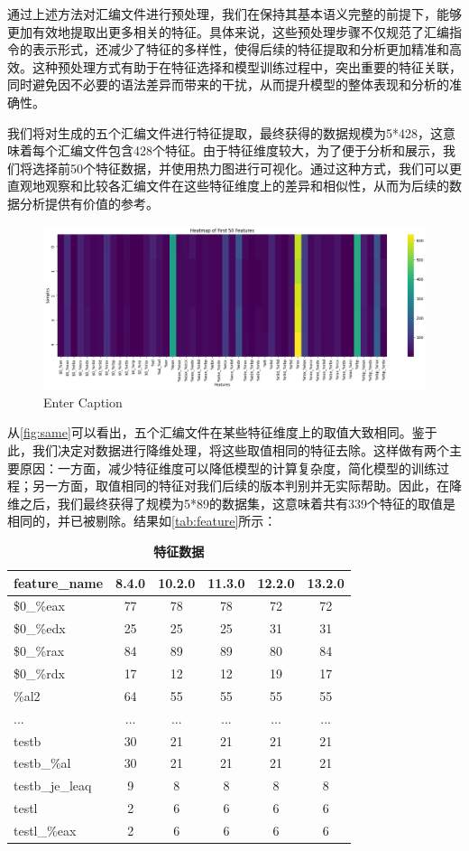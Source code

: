  通过上述方法对汇编文件进行预处理，我们在保持其基本语义完整的前提下，能够更加有效地提取出更多相关的特征。具体来说，这些预处理步骤不仅规范了汇编指令的表示形式，还减少了特征的多样性，使得后续的特征提取和分析更加精准和高效。这种预处理方式有助于在特征选择和模型训练过程中，突出重要的特征关联，同时避免因不必要的语法差异而带来的干扰，从而提升模型的整体表现和分析的准确性。

  我们将对生成的五个汇编文件进行特征提取，最终获得的数据规模为5*428，这意味着每个汇编文件包含428个特征。由于特征维度较大，为了便于分析和展示，我们将选择前50个特征数据，并使用热力图进行可视化。通过这种方式，我们可以更直观地观察和比较各汇编文件在这些特征维度上的差异和相似性，从而为后续的数据分析提供有价值的参考。
  \begin{figure}
      \centering
      \includegraphics[width=1\linewidth]{figures/same.png}
      \caption{Enter Caption}
      \label{fig:same}
  \end{figure}


从\autoref{fig:same}可以看出，五个汇编文件在某些特征维度上的取值大致相同。鉴于此，我们决定对数据进行降维处理，将这些取值相同的特征去除。这样做有两个主要原因：一方面，减少特征维度可以降低模型的计算复杂度，简化模型的训练过程；另一方面，取值相同的特征对我们后续的版本判别并无实际帮助。因此，在降维之后，我们最终获得了规模为5*89的数据集，这意味着共有339个特征的取值是相同的，并已被剔除。结果如\autoref{tab:feature}所示：
\begin{table}[H]
\caption{\textbf{特征数据}}%
\label{tab:feature}
\centering%
\begin{tabular}{lccccc}%
\toprule%
 feature\_name&8.4.0 & 10.2.0 & 11.3.0 & 12.2.0 & 13.2.0 \\ 
\midrule%
\$0\_\%eax&77&78&78&72&72 \\
\$0\_\%edx&25 & 25 & 25 & 31 & 31 \\
\$0\_\%rax&84 & 89 & 89 & 80 & 84 \\
\$0\_\%rdx&17 & 12 & 12 & 19 & 17 \\
\%al2 & 64 & 55 & 55 & 55&55 \\
...&... & ... & ... & ... & ... \\
testb&30 & 21 & 21 & 21 & 21 \\
testb\_\%al&30 & 21 & 21 & 21 & 21 \\
testb\_je\_leaq&9 & 8 & 8 & 8 & 8 \\
testl&2 & 6 & 6 & 6 & 6 \\
testl\_\%eax&2 & 6 & 6 & 6 & 6 \\
\bottomrule%
\end{tabular}
\end{table}
   

